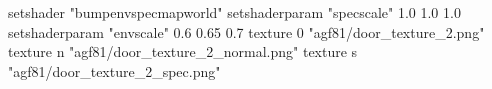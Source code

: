 setshader "bumpenvspecmapworld"
setshaderparam "specscale" 1.0 1.0 1.0
setshaderparam "envscale"  0.6 0.65 0.7
    texture 0 "agf81/door_texture_2.png"
    texture n "agf81/door_texture_2_normal.png"
    texture s "agf81/door_texture_2_spec.png"